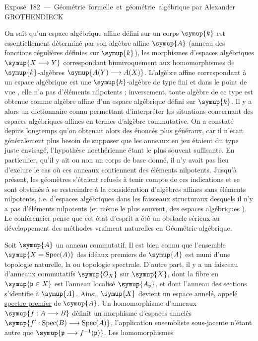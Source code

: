 \unit{Exposé 182 — Géométrie formelle et géométrie algébrique}
%
  {par Alexander GROTHENDIECK}


On sait qu'un espace algébrique affine défini sur un corps $\symup{k}$ est
essentiellement déterminé par son algèbre affine $\symup{A}$ (anneau des fonctions
régulières définies sur $\symup{k}$), les morphismes d'espaces algébriques
$\symup{X\longrightarrow Y}$ correspondant biunivoquement aux homomorphismes de
$\symup{k}$-algèbres $\symup{A(Y)\longrightarrow A(X)}$. L'algèbre affine correspondant à un
espace algébrique est une $\symup{k}$-algèbre de type fini et dans le point de vue
, elle n'a pas d'éléments nilpotents ; inversement, toute algèbre
de ce type est obtenue comme algèbre affine d'un espace algébrique défini sur
$\symup{k}$. Il y a alors un dictionnaire connu permettant d'interpréter les situations
concernant des espaces algébriques affines en termes d'algèbre commutative. On
a constaté depuis longtemps qu'on obtenait alors des énoncés plus généraux, car
il n'était généralement plus besoin de supposer que les anneaux en jeu étaient
du type juste envisagé, l'hypothèse noethérienne étant le plus souvent
suffisante. En particulier, qu'il y ait ou non un corps de base donné, il n'y
avait pas lieu d'exclure le cas où ces anneaux contiennent des éléments
nilpotents. Jusqu'à présent, les géomètres s'étaient refusés à tenir compte de
ces indications et se sont obstinés à se restreindre à la considération
d'algèbres affines sans éléments nilpotents, i.e. d'espaces algébriques dans les
faisceaux structuraux desquels il n'y a pas d'éléments nilpotents (et même le
plus souvent, des espaces algébriques ). Le
conférencier pense que cet état d'esprit a été un obstacle sérieux au
développement des méthodes vraiment naturelles en Géométrie algébrique.

Soit $\symup{A}$ un anneau commutatif. Il est bien connu que l'ensemble
$\symup{X=\operatorname{Spec}(A)}$ des idéaux premiers de $\symup{A}$ est muni d'une topologie
naturelle, la  ou topologie spectrale. D'autre part, il
y a un faisceau d'anneaux commutatifs $\symup{O_X}$ sur $\symup{X}$, dont la fibre en
$\symup{\mathfrak p\in X}$ est l'anneau localisé $\symup{A_{\mathfrak p}}$, et dont l'anneau des
sections s'identifie à $\symup{A}$. Ainsi, $\symup{X}$ devient un \uline{espace annelé}, appelé
\uline{spectre premier} de $\symup{A}$. Un homomorphisme d'anneaux
$\symup{f:A\longrightarrow B}$ définit un morphisme d'espaces annelés
$\symup{f':\operatorname{Spec}(B)\longrightarrow\operatorname{Spec}(A)}$,
l'application ensembliste sous-jacente n'étant autre que
$\symup{\mathfrak p\longrightarrow f^{-1}(\mathfrak p)}$. Les homomorphismes

